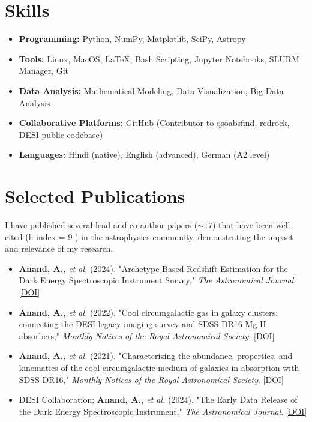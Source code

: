 \documentclass[a4paper,10pt]{article}
\begin{document}
\section*{Skills}
\begin{itemize}[noitemsep, topsep=0pt]
    \item \textbf{Programming:} Python, NumPy, Matplotlib, SciPy, Astropy
    \item \textbf{Tools:} Linux, MacOS, LaTeX, Bash Scripting, Jupyter Notebooks, SLURM Manager, Git
    \item \textbf{Data Analysis:} Mathematical Modeling, Data Visualization, Big Data Analysis
    \item \textbf{Collaborative Platforms:} GitHub (Contributor to \href{https://github.com/abhi0395/qsoabsfind}{qsoabsfind}, \href{https://github.com/desihub/redrock}{redrock}, \href{https://github.com/desihub}{DESI public codebase})
     \item \textbf{Languages:} Hindi (native), English (advanced), German (A2 level)
\end{itemize}


\section*{Selected Publications}
I have published several lead and co-author papers ($\sim 17$) that have been well-cited (h-index = 9 ) in the astrophysics community, demonstrating the impact and relevance of my research.
\begin{itemize}[noitemsep, topsep=0pt]
    \item \textbf{Anand, A.,} \textit{et al.} (2024). "Archetype-Based Redshift Estimation for the Dark Energy Spectroscopic Instrument Survey," \textit{The Astronomical Journal}. \href{https://iopscience.iop.org/article/10.3847/1538-3881/ad60c2}{[DOI]}
    \item \textbf{Anand, A.,} \textit{et al.} (2022). "Cool circumgalactic gas in galaxy clusters: connecting the DESI legacy imaging survey and SDSS DR16 Mg II absorbers," \textit{Monthly Notices of the Royal Astronomical Society}. \href{https://doi.org/10.1093/mnras/stab871}{[DOI]}
    \item \textbf{Anand, A.,} \textit{et al.} (2021). "Characterizing the abundance, properties, and kinematics of the cool circumgalactic medium of galaxies in absorption with SDSS DR16," \textit{Monthly Notices of the Royal Astronomical Society}. \href{https://doi.org/10.1093/mnras/stac928}{[DOI]}
    \item DESI Collaboration; \textbf{Anand, A.,} \textit{et al.} (2024). "The Early Data Release of the Dark Energy Spectroscopic Instrument," \textit{The Astronomical Journal}. \href{https://doi.org/10.3847/1538-3881/ad3217}{[DOI]}
\end{itemize}
\end{document}
